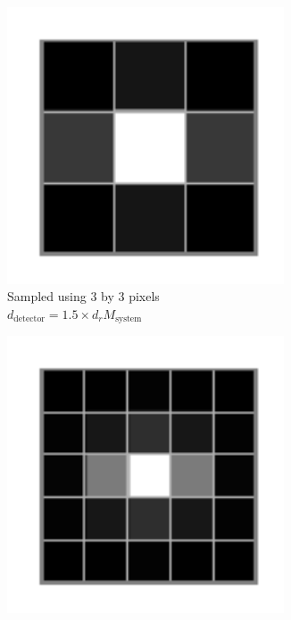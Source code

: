 \begin{figure}
\ContinuedFloat\centering
      \begin{subfigure}[t]{0.4\textwidth}
        \centering
        \includegraphics[width=0.9\textwidth]{./sampling/digital_airy_sample_3}
        \caption{Sampled using 3 by 3 pixels\\
        \(d_{\text{detector}} = 1.5 \times d_{r}M_{\text{system}}\)}\label{fig:digital_airy_sample_3}
    \end{subfigure}\quad
    \begin{subfigure}[t]{0.4\textwidth}
        \centering
        \includegraphics[width=0.9\textwidth]{./sampling/digital_airy_sample_5}

\end{subfigure}
\end{figure}
